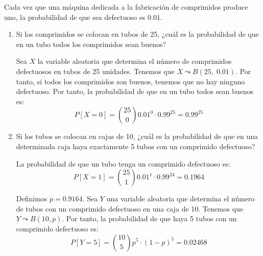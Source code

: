 \begin{ejercicio}
    Cada vez que una máquina dedicada a la fabricación de comprimidos produce uno, la probabilidad de que sea defectuoso es $0.01$.
    \begin{enumerate}
        \item  Si los comprimidos se colocan en tubos de 25, ¿cuál es la probabilidad de que en un tubo todos los comprimidos sean buenos?

        Sea $X$ la variable aleatoria que determina el número de comprimidos defectuosos en tubos de 25 unidades. Tenemos que $X\leadsto B(25,\;0.01)$. Por tanto, si todos los comprimidos son buenos, tenemos que no hay ninguno defectuoso. Por tanto, la probabilidad de que en un tubo todos sean buenos es:
        \begin{equation*}
            P[X=0]=\binom{25}{0}0.01^0\cdot 0.99^{25} = 0.99^{25}
        \end{equation*}
        
        \item  Si los tubos se colocan en cajas de 10, ¿cuál es la probabilidad de que en una determinada caja haya exactamente 5 tubos con un comprimido defectuoso?

        La probabilidad de que un tubo tenga un comprimido defectuoso es:
        \begin{equation*}
            P[X=1]=\binom{25}{1}0.01^1\cdot 0.99^{24} = 0.1964
        \end{equation*}

        Definimos $p=0.9164$. Sea $Y$ una variable aleatoria que determina el número de tubos con un comprimido defectuoso en una caja de 10. Tenemos que $Y\leadsto B(10,p)$. Por tanto, la probabilidad de que haya 5 tubos con un comprimido defectuoso es:
        \begin{equation*}
            P[Y=5]=\binom{10}{5}p^5\cdot (1-p)^{5} = 0.02468
        \end{equation*}
    \end{enumerate}
\end{ejercicio}


